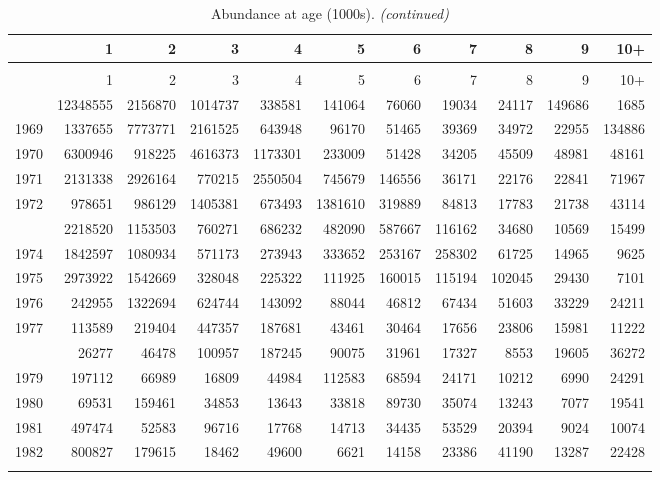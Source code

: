\documentclass[
]{article}
\begin{document}
\begin{longtable}[t]{lrrrrrrrrrr}
\caption{\label{tab:NAA-table}Abundance at age (1000s).}\\
\toprule
  & 1 & 2 & 3 & 4 & 5 & 6 & 7 & 8 & 9 & 10+\\
\midrule
\endfirsthead
\caption[]{Abundance at age (1000s). \textit{(continued)}}\\
\toprule
  & 1 & 2 & 3 & 4 & 5 & 6 & 7 & 8 & 9 & 10+\\
\midrule
\endhead

\endfoot
\bottomrule
\endlastfoot
1968 & 12348555 & 2156870 & 1014737 & 338581 & 141064 & 76060 & 19034 & 24117 & 149686 & 1685\\
1969 & 1337655 & 7773771 & 2161525 & 643948 & 96170 & 51465 & 39369 & 34972 & 22955 & 134886\\
1970 & 6300946 & 918225 & 4616373 & 1173301 & 233009 & 51428 & 34205 & 45509 & 48981 & 48161\\
1971 & 2131338 & 2926164 & 770215 & 2550504 & 745679 & 146556 & 36171 & 22176 & 22841 & 71967\\
1972 & 978651 & 986129 & 1405381 & 673493 & 1381610 & 319889 & 84813 & 17783 & 21738 & 43114\\
\addlinespace
1973 & 2218520 & 1153503 & 760271 & 686232 & 482090 & 587667 & 116162 & 34680 & 10569 & 15499\\
1974 & 1842597 & 1080934 & 571173 & 273943 & 333652 & 253167 & 258302 & 61725 & 14965 & 9625\\
1975 & 2973922 & 1542669 & 328048 & 225322 & 111925 & 160015 & 115194 & 102045 & 29430 & 7101\\
1976 & 242955 & 1322694 & 624744 & 143092 & 88044 & 46812 & 67434 & 51603 & 33229 & 24211\\
1977 & 113589 & 219404 & 447357 & 187681 & 43461 & 30464 & 17656 & 23806 & 15981 & 11222\\
\addlinespace
1978 & 26277 & 46478 & 100957 & 187245 & 90075 & 31961 & 17327 & 8553 & 19605 & 36272\\
1979 & 197112 & 66989 & 16809 & 44984 & 112583 & 68594 & 24171 & 10212 & 6990 & 24291\\
1980 & 69531 & 159461 & 34853 & 13643 & 33818 & 89730 & 35074 & 13243 & 7077 & 19541\\
1981 & 497474 & 52583 & 96716 & 17768 & 14713 & 34435 & 53529 & 20394 & 9024 & 10074\\
1982 & 800827 & 179615 & 18462 & 49600 & 6621 & 14158 & 23386 & 41190 & 13287 & 22428\\
\addlinespace

\end{longtable}
\end{document}
